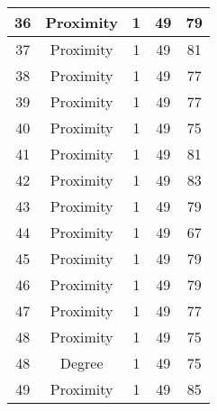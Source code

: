 \documentclass[results.tex]{subfiles}
\begin{document}
\begin{center}
\begin{tabular}{| c || c | c | c | c |}
            \hline
            36                      & Proximity                    & 1                      & 49                      & 79                   \\
            \hline
            37                      & Proximity                    & 1                      & 49                      & 81                   \\
            \hline
            38                      & Proximity                    & 1                      & 49                      & 77                   \\
            \hline
            39                      & Proximity                    & 1                      & 49                      & 77                   \\
            \hline
            40                      & Proximity                    & 1                      & 49                      & 75                   \\
            \hline
            41                      & Proximity                    & 1                      & 49                      & 81                   \\
            \hline
            42                      & Proximity                    & 1                      & 49                      & 83                   \\
            \hline
            43                      & Proximity                    & 1                      & 49                      & 79                   \\
            \hline
            44                      & Proximity                    & 1                      & 49                      & 67                   \\
            \hline
            45                      & Proximity                    & 1                      & 49                      & 79                   \\
            \hline
            46                      & Proximity                    & 1                      & 49                      & 79                   \\
            \hline
            47                      & Proximity                    & 1                      & 49                      & 77                   \\
            \hline
            48                      & Proximity                    & 1                      & 49                      & 75                   \\
            \hline
            48                      & Degree                       & 1                      & 49                      & 75                   \\
            \hline
            49                      & Proximity                    & 1                      & 49                      & 85                   \\
            \hline
        \end{tabular}
    \end{center}
\end{document}
